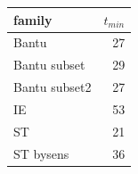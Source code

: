 
\begin{tabular}[t]{lr}
\toprule
family & $t_{min}$\\
\midrule
Bantu & 27\\
Bantu subset & 29\\
Bantu subset2 & 27\\
IE & 53\\
ST & 21\\
ST bysens & 36\\
\bottomrule
\end{tabular}
